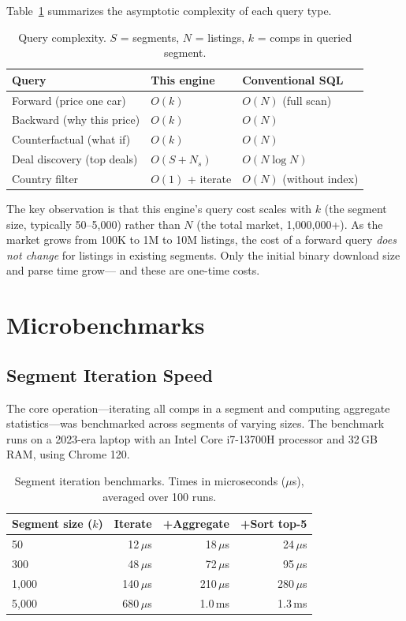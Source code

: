 \documentclass[11pt,a4paper,twoside]{book}
\begin{document}
Table~\ref{tab:complexity} summarizes the asymptotic complexity of each query type.

\begin{table}[H]
\centering
\caption{Query complexity. $S$ = segments, $N$ = listings, $k$ = comps in queried segment.}
\label{tab:complexity}
\begin{tabular}{@{}lll@{}}
\toprule
\textbf{Query} & \textbf{This engine} & \textbf{Conventional SQL} \\
\midrule
Forward (price one car)     & $O(k)$            & $O(N)$ (full scan) \\
Backward (why this price)   & $O(k)$            & $O(N)$ \\
Counterfactual (what if)    & $O(k)$            & $O(N)$ \\
Deal discovery (top deals)  & $O(S + N_s)$      & $O(N \log N)$ \\
Country filter              & $O(1)$ + iterate  & $O(N)$ (without index) \\
\bottomrule
\end{tabular}
\end{table}

The key observation is that this engine's query cost scales with $k$ (the segment size,
typically 50--5,000) rather than $N$ (the total market, 1,000,000+). As the market grows
from 100K to 1M to 10M listings, the cost of a forward query \textit{does not change} for
listings in existing segments. Only the initial binary download size and parse time grow---
and these are one-time costs.

\section{Microbenchmarks}

\subsection{Segment Iteration Speed}

The core operation---iterating all comps in a segment and computing aggregate statistics---was
benchmarked across segments of varying sizes. The benchmark runs on a 2023-era laptop with
an Intel Core i7-13700H processor and 32\,GB RAM, using Chrome 120.

\begin{table}[H]
\centering
\caption{Segment iteration benchmarks. Times in microseconds ($\mu$s), averaged over 100 runs.}
\label{tab:micro}
\begin{tabular}{@{}lrrr@{}}
\toprule
\textbf{Segment size ($k$)} & \textbf{Iterate} & \textbf{+Aggregate} & \textbf{+Sort top-5} \\
\midrule
50    & 12\,$\mu$s  & 18\,$\mu$s  & 24\,$\mu$s  \\
300   & 48\,$\mu$s  & 72\,$\mu$s  & 95\,$\mu$s  \\
1,000 & 140\,$\mu$s & 210\,$\mu$s & 280\,$\mu$s \\
5,000 & 680\,$\mu$s & 1.0\,ms    & 1.3\,ms    \\
\bottomrule
\end{tabular}
\end{table}
\end{document}
